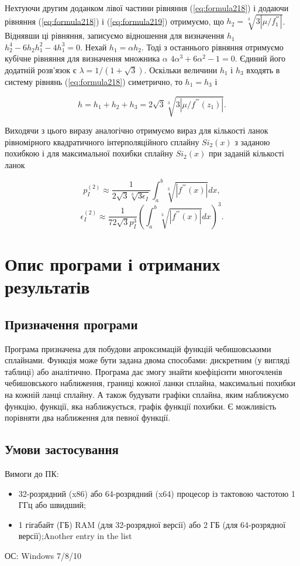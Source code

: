 \documentclass[ukrainian,14pt]{extarticle}
\begin{document}
Нехтуючи другим доданком лівої частини рівняння (\ref{eq:formula218}) і додаючи рівняння (\ref{eq:formula218}) і (\ref{eq:formula219}) отримуємо, що $h_2 = \sqrt[3]{3|\mu/f^{'''}_1|}$. Віднявши ці рівняння, записуємо відношення для визначення $h_1$ $h_2^4 - 6h_2 h_1^2 - 4h_1^3 = 0$. Нехай $h_1 = \alpha h_2$. Тоді з останнього рівняння отримуємо кубічне рівняння для визначення множника $\alpha$ $4\alpha^3 + 6\alpha^2 - 1 = 0$. Єдиний його додатній розв'язок є $\lambda = 1 / (1 + \sqrt{3})$. Оскільки величини $h_1$ і $h_3$ входять в систему рівнянь (\ref{eq:formula218}) симетрично, то $h_1 = h_3$ і 

$$h = h_1 + h_2 + h_3 = 2 \sqrt{3} \sqrt[3]{3|\mu/f^{'''}(z_1)|}.$$

Виходячи з цього виразу аналогічно отримуємо вираз для кількості ланок рівномірного квадратичного інтерполяційного сплайну $Si_2(x)$ з заданою похибкою і для максимальної похибки сплайну $Si_2(x)$ при заданій кількості ланок

$$p_I^{(2)} \approx \frac{1}{2\sqrt{3} \sqrt[3]{3\epsilon_I}} \int_a^b \sqrt[3]{|f^{'''}(x)|}dx,$$
$$\epsilon_I^{(2)} \approx \frac{1}{72 \sqrt{3} p_I^{3}} \left(\int_a^b \sqrt[3]{|f^{'''}(x)|}dx \right)^3.$$


\newpage
\section{Опис програми і отриманих результатів}
\subsection{Призначення програми}

Програма призначена для побудови апроксимацій функцій чебишовськими сплайнами. Функція може бути задана двома способами: дискретним (у вигляді таблиці) або аналітично. Програма дає змогу знайти коефіцієнти многочленів чебишовського наближення, границі кожної ланки сплайна, максимальні похибки на кожній ланці сплайну. А також будувати графіки сплайна, яким наближуємо функцію, функції, яка наближується, графік функції похибки. Є можливість порівняти два наближення для певної функції. 

\subsection{Умови застосування}
Вимоги до ПК:

\begin{itemize}
  \item 32-розрядний (x86) або 64-розрядний (x64) процесор із тактовою частотою 1 ГГц або швидший;
  \item 1 гігабайт (ГБ) RAM (для 32-розрядної версії) або 2 ГБ (для 64-розрядної версії);Another entry in the list
\end{itemize}
ОС: Windows 7/8/10
\end{document}
